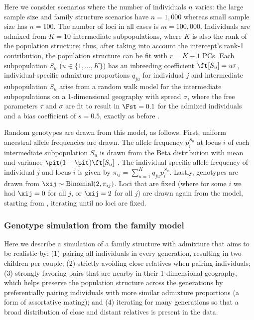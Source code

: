 \documentclass[11pt]{article}
\begin{document}
Here we consider scenarios where the number of individuals $n$ varies:
the large sample size and family structure scenarios have $n = 1,000$ whereas small sample size has $n = 100$.
The number of loci in all cases is $m = 100,000$.
Individuals are admixed from $K = 10$ intermediate subpopulations, where $K$ is also the rank of the population structure; thus, after taking into account the intercept's rank-1 contribution, the population structure can be fit with $r = K-1$ PCs.
Each subpopulation $S_u$ ($u \in \{ 1, ..., K \}$) has an inbreeding coefficient $\ft[S_u] = u \tau$, individual-specific admixture proportions $q_{ju}$ for individual $j$ and intermediate subpopulation $S_u$ arise from a random walk model for the intermediate subpopulations on a 1-dimensional geography with spread $\sigma$, where the free parameters $\tau$ and $\sigma$ are fit to result in $\Fst = 0.1$ for the admixed individuals and a bias coefficient of $s = 0.5$, exactly as before \citep{ochoa_fst2}.

Random genotypes are drawn from this model, as follows.
First, uniform ancestral allele frequencies \pit are drawn.
The allele frequency $p_i^{S_u}$ at locus $i$ of each intermediate subpopulation $S_u$ is drawn from the Beta distribution with mean \pit and variance $\pit(1-\pit) \ft[S_u]$ \citep{balding_method_1995}.
The individual-specific allele frequency of individual $j$ and locus $i$ is given by
$
\pi_{ij} = \sum_{u = 1}^K q_{ju} p_i^{S_u}.
$
Lastly, genotypes are drawn from $\xij \sim \text{Binomial}(2, \pi_{ij})$.
Loci that are fixed (where for some $i$ we had $\xij = 0$ for all $j$, or $\xij = 2$ for all $j$) are drawn again from the model, starting from \pit, iterating until no loci are fixed.

\subsubsection{Genotype simulation from the family model}

Here we describe a simulation of a family structure with admixture that aims to be realistic by:
(1) pairing all individuals in every generation, resulting in two children per couple;
(2) strictly avoiding close relatives when pairing individuals;
(3) strongly favoring pairs that are nearby in their 1-dimensional geography, which helps preserve the population structure across the generations by preferentially pairing individuals with more similar admixture proportions (a form of assortative mating); and
(4) iterating for many generations so that a broad distribution of close and distant relatives is present in the data.
\end{document}
